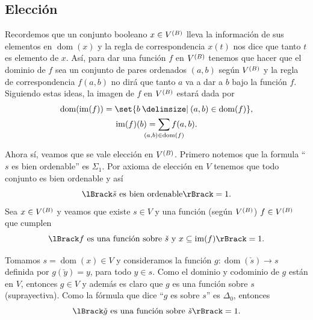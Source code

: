 \documentclass[letterpaper,DIV=15,12pt]{scrartcl}
\theoremstyle{manual}
\DeclarePairedDelimiter{\vb}{\lBrack}{\rBrack}             %
\DeclareMathOperator{\dom}{dom}                            %
\DeclareMathOperator{\im}{im}                              %
\newcommand{\st}{}
\newcommand{\SetSymbol}[1][]{%
\nonscript\:#1\vert
\allowbreak
\nonscript\:
\mathopen{}}
\renewcommand\st{\SetSymbol[\delimsize]}
\begin{document}
\subsection{Elección}
Recordemos que un conjunto booleano \(x\in\mb\) lleva la información de sus
elementos en \(\dom(x)\) y la regla de correspondencia \(x(t)\) nos dice que
tanto \(t\) es elemento de \(x\). Así, para dar una función \(f\) en \(\mb\)
tenemos que hacer que el dominio de \(f\) sea un conjunto de pares ordenados
\((a,b)\) según \(\mb\) y la regla de correspondencia \(f(a,b)\) no dirá que
tanto \(a\) va a dar a \(b\) bajo la función \(f\). Siguiendo estas ideas, la
imagen de \(f\) en \(\mb\) estará dada por
\begin{equation}
  \label{eq:im}
  \begin{gathered}
    \dom(\im(f))=\set{b\st(a,b)\in\dom(f)},\\
    \im(f)(b)=\smashoperator{\sum_{(a,b)\in\dom(f)}}f(a,b).
  \end{gathered}
\end{equation}

Ahora sí, veamos que se vale elección en \(\mb\).
Primero notemos que la formula \enquote{\(s\) es bien ordenable} es
\(\Sigma_{1}\). Por axioma de elección en \(V\) tenemos que todo conjunto es
bien ordenable y así
\begin{equation*}
  \vb{\check{s}\text{ es bien ordenable}}=1.
\end{equation*}
Sea \(x\in\mb\) y veamos que existe \(s\in V\) y una función (según \(\mb\))
\(f\in\mb\) que cumplen
\begin{equation*}
  \vb{\text{\(f\) es una función sobre \(\check{s}\) y
  \(x\subseteq\im(f)\)}}=1.
\end{equation*}

Tomamos \(s=\dom(x)\in V\) y consideramos la función
\(g\colon\dom(\check{s})\to s\) definida por \(g(\check{y})=y\), para todo
\(y\in s\). Como el dominio y codominio de \(g\) están en \(V\), entonces 
\(g\in V\) y además es claro que \(g\) es una función sobre \(s\)
(suprayectiva). Como la fórmula que dice \enquote{\(g\) es sobre \(s\)} es
\(\Delta_{0}\), entonces
\begin{equation*}
  \vb{\text{\(\check{g}\) es una función sobre \(\check{s}\)}}=1.
\end{equation*}
\end{document}
